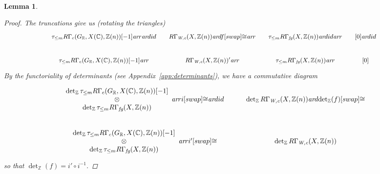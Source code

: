 \documentclass[10pt,a4paper,oneside,draft]{article}
\newcommand{\CC}{\mathbb{C}}
\newcommand{\RR}{\mathbb{R}}
\newcommand{\ZZ}{\mathbb{Z}}
\renewcommand{\det}{\operatorname{det}}
\newcommand{\ar}{\text{\it ar}}
\newcommand{\fg}{\text{\it fg}}
\newcommand{\Wc}{\text{\it W,c}}
\theoremstyle{myplain}
\newtheorem{lemma}[theorem]{Lemma}
\theoremstyle{mydefinition}
\numberwithin{equation}{section}
\begin{document}
\begin{lemma}
\begin{proof}
    The truncations give us (rotating the triangles)
    \[ \begin{tikzcd}[column sep=1em,font=\small]
        \tau_{\le m} R\Gamma_c (G_\RR, X (\CC), \ZZ (n))[-1] \ar{r}\ar{d}{id} & R\Gamma_\Wc (X, \ZZ (n))\ar{d}{f}[swap]{\cong}\ar{r} & \tau_{\le m} R\Gamma_\fg (X,\ZZ(n)) \ar{d}{id}\ar{r} & {[0]} \ar{d}{id} \\
        \tau_{\le m} R\Gamma_c (G_\RR, X (\CC), \ZZ (n))[-1] \ar{r} & R\Gamma_\Wc (X, \ZZ (n))' \ar{r} & \tau_{\le m} R\Gamma_\fg (X,\ZZ(n)) \ar{r} & {[0]}
      \end{tikzcd} \]
    By the functoriality of determinants (see Appendix~\ref{app:determinants}),
    we have a commutative diagram
    \[ \begin{tikzcd}
        \begin{array}{c} \det_\ZZ \tau_{\le m} R\Gamma_c (G_\RR, X (\CC), \ZZ (n))[-1] \\ \otimes \\ \det_\ZZ \tau_{\le m} R\Gamma_\fg (X,\ZZ(n)) \end{array} \ar{r}{i}[swap]{\cong} \ar{d}{id} & \det_\ZZ R\Gamma_\Wc (X,\ZZ(n)) \ar{d}{\det_\ZZ (f)}[swap]{\cong} \\
        \begin{array}{c} \det_\ZZ \tau_{\le m} R\Gamma_c (G_\RR, X (\CC), \ZZ (n))[-1] \\ \otimes \\ \det_\ZZ \tau_{\le m} R\Gamma_\fg (X, \ZZ (n)) \end{array} \ar{r}{i'}[swap]{\cong} & \det_\ZZ R\Gamma_\Wc (X,\ZZ(n))
      \end{tikzcd} \]
    so that $\det_\ZZ (f) = i'\circ i^{-1}$.
  \end{proof}
\end{lemma}
\end{document}
